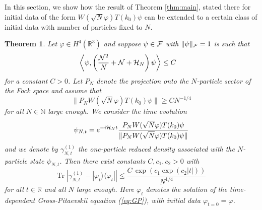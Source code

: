 \documentclass[11pt,a4paper]{article}
\newtheorem{thm}{Theorem}[section]  %
\newcommand{\bR}{{\mathbb R}}
\newcommand{\bN}{{\mathbb N}}
\newcommand{\tr}{\mbox{Tr}}
\newcommand{\cF}{{\cal F}}
\newcommand{\cH}{{\cal H}}
\newcommand{\cN}{{\cal N}}
\begin{document}
In this section, we show how the result of Theorem \ref{thm:main}, stated there for initial data of the form $W(\sqrt{N} \varphi) T(k_0) \psi$ can be extended to a certain class of initial data with number of particles fixed to $N$. 
\begin{thm}\label{thm:Npart}
Let $\varphi \in H^4 (\bR^3)$ and suppose $\psi \in \cF$ with $\| \psi \|_\cF  =1$ is such that \begin{equation}\label{eq:ass1-N} \begin{split} \left\langle \psi , \left( \frac{\cN^2}{N} + \cN + \cH_N \right) \psi \right\rangle &\leq C  \end{split} \end{equation}
for a constant $C>0$. Let $P_N$ denote the projection onto the $N$-particle sector of the Fock space and assume that 
\begin{equation}\label{eq:ass2-N} \| P_N W(\sqrt{N} \varphi) T(k_0) \psi \| \geq C N^{-1/4} \end{equation}
for all $N \in \bN$ large enough. We consider the time evolution 
\[ \psi_{N,t} = e^{-i \cH_N t} \frac{P_N W(\sqrt{N} \varphi) T(k_0) \psi}{\| P_N W(\sqrt{N} \varphi) T(k_0) \psi \|} \] and we denote by $\gamma_{N,t}^{(1)}$ the one-particle reduced density associated with the $N$-particle state $\psi_{N,t}$. Then there exist constants $C, c_1 ,c_2 > 0$ with 
\[ \tr  \; \left| \gamma^{(1)}_{N,t} - | \varphi_t \rangle \langle \varphi_t| \right| \leq \frac{C\,  \exp \left( c_1 \exp (c_2 |t|) \right)}{N^{1/4}} \]
for all $t \in \bR$ and all $N$ large enough. Here $\varphi_t$ denotes the solution of the time-dependent Gross-Pitaevskii equation (\ref{eq:GP}), with initial data $\varphi_{t=0} = \varphi$. 
\end{thm}
\end{document}
